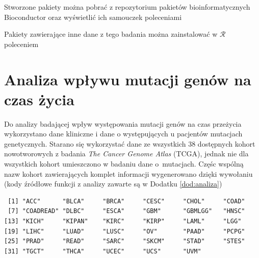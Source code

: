 Stworzone pakiety można pobrać z repozytorium pakietów bioinformatycznych Bioconductor oraz wyświetlić ich samouczek poleceniami

\begin{Shaded}
\begin{Highlighting}[]
\NormalTok{(}\NormalTok{)}
\NormalTok{(}\NormalTok{)}
\NormalTok{(}\NormalTok{)}
\NormalTok{(}\NormalTok{)}
\NormalTok{(}\NormalTok{)}
\end{Highlighting}
\end{Shaded}

Pakiety zawierające inne dane z tego badania można zainstalować w $\mathcal{R}$ poleceniem

\begin{Shaded}
\begin{Highlighting}[]
\NormalTok{()}
\end{Highlighting}
\end{Shaded}

\newpage

\section{Analiza wpływu mutacji genów na czas życia}\label{chap:analiza}

Do analizy badającej wpływ występowania mutacji genów na czas przeżycia
wykorzystano dane kliniczne i dane o występujących u pacjentów mutacjach
genetycznych. Starano się wykorzystać dane ze wszystkich 38 dostępnych
kohort nowotworowych z badania \textit{The Cancer Genome Atlas} (TCGA),
jednak nie dla wszystkich kohort umieszczono w badaniu dane o~mutacjach.
Częśc wspólną nazw kohort zawierających komplet informacji wygenerowano dzięki wywołaniu (kody źródłowe funkcji z analizy zawarte są w Dodatku \ref{dod:analiza})

\begin{Shaded}
\begin{Highlighting}[]
\NormalTok{(}\NormalTok{() ->}\StringTok{ }
\end{Highlighting}
\end{Shaded}

\begin{verbatim}
 [1] "ACC"      "BLCA"     "BRCA"     "CESC"     "CHOL"     "COAD"    
 [7] "COADREAD" "DLBC"     "ESCA"     "GBM"      "GBMLGG"   "HNSC"    
[13] "KICH"     "KIPAN"    "KIRC"     "KIRP"     "LAML"     "LGG"     
[19] "LIHC"     "LUAD"     "LUSC"     "OV"       "PAAD"     "PCPG"    
[25] "PRAD"     "READ"     "SARC"     "SKCM"     "STAD"     "STES"    
[31] "TGCT"     "THCA"     "UCEC"     "UCS"      "UVM"     
\end{verbatim}


